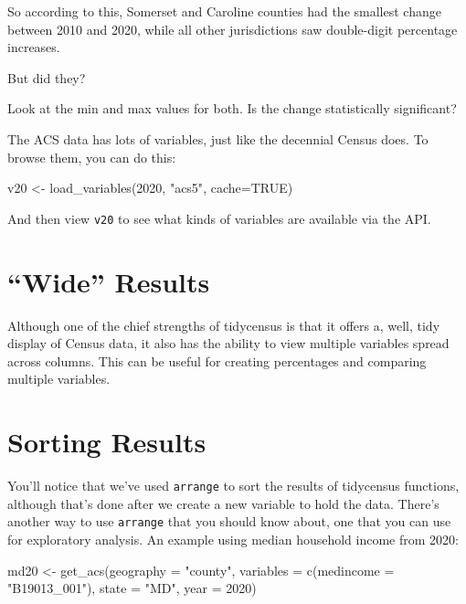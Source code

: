 \documentclass[
  letterpaper,
  DIV=11,
  numbers=noendperiod]{scrreprt}
\newenvironment{Shaded}{\begin{snugshade}}{\end{snugshade}}
\newcommand{\AttributeTok}[1]{\textcolor[rgb]{0.40,0.45,0.13}{#1}}
\newcommand{\ConstantTok}[1]{\textcolor[rgb]{0.56,0.35,0.01}{#1}}
\newcommand{\DecValTok}[1]{\textcolor[rgb]{0.68,0.00,0.00}{#1}}
\newcommand{\FunctionTok}[1]{\textcolor[rgb]{0.28,0.35,0.67}{#1}}
\newcommand{\NormalTok}[1]{\textcolor[rgb]{0.00,0.23,0.31}{#1}}
\newcommand{\OtherTok}[1]{\textcolor[rgb]{0.00,0.23,0.31}{#1}}
\newcommand{\StringTok}[1]{\textcolor[rgb]{0.13,0.47,0.30}{#1}}
\begin{document}
So according to this, Somerset and Caroline counties had the smallest
change between 2010 and 2020, while all other jurisdictions saw
double-digit percentage increases.

But did they?

Look at the min and max values for both. Is the change statistically
significant?

The ACS data has lots of variables, just like the decennial Census does.
To browse them, you can do this:

\begin{Shaded}
\begin{Highlighting}[]
\NormalTok{v20 }\OtherTok{\textless{}{-}} \FunctionTok{load\_variables}\NormalTok{(}\DecValTok{2020}\NormalTok{, }\StringTok{"acs5"}\NormalTok{, }\AttributeTok{cache=}\ConstantTok{TRUE}\NormalTok{)}
\end{Highlighting}
\end{Shaded}

And then view \texttt{v20} to see what kinds of variables are available
via the API.

\hypertarget{wide-results}{%
\section{``Wide'' Results}\label{wide-results}}

Although one of the chief strengths of tidycensus is that it offers a,
well, tidy display of Census data, it also has the ability to view
multiple variables spread across columns. This can be useful for
creating percentages and comparing multiple variables.

\hypertarget{sorting-results}{%
\section{Sorting Results}\label{sorting-results}}

You'll notice that we've used \texttt{arrange} to sort the results of
tidycensus functions, although that's done after we create a new
variable to hold the data. There's another way to use \texttt{arrange}
that you should know about, one that you can use for exploratory
analysis. An example using median household income from 2020:

\begin{Shaded}
\begin{Highlighting}[]
\NormalTok{md20 }\OtherTok{\textless{}{-}} \FunctionTok{get\_acs}\NormalTok{(}\AttributeTok{geography =} \StringTok{"county"}\NormalTok{,}
              \AttributeTok{variables =} \FunctionTok{c}\NormalTok{(}\AttributeTok{medincome =} \StringTok{"B19013\_001"}\NormalTok{),}
              \AttributeTok{state =} \StringTok{"MD"}\NormalTok{,}
              \AttributeTok{year =} \DecValTok{2020}\NormalTok{)}
\end{Highlighting}
\end{Shaded}
\end{document}
